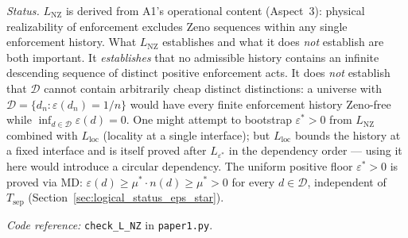 \documentclass[11pt]{article}
\theoremstyle{remark}
\newcommand{\coderef}[2]{\smallskip\noindent\textit{Code reference:} \texttt{#1} in \texttt{#2}.}
\begin{document}
\begin{tcolorbox}[apfbox, title={Lemma $L_{\mathrm{NZ}}$ (No Zeno Enforcement)}]
\smallskip\noindent\textit{Status.}  $L_{\mathrm{NZ}}$ is derived from A1's operational content (Aspect~3): physical realizability of enforcement excludes Zeno sequences within any single enforcement history.  What $L_{\mathrm{NZ}}$ establishes and what it does \emph{not} establish are both important.  It \emph{establishes} that no admissible history contains an infinite descending sequence of distinct positive enforcement acts.  It does \emph{not} establish that $\mathcal{D}$ cannot contain arbitrarily cheap distinct distinctions: a universe with $\mathcal{D} = \{d_n : \varepsilon(d_n) = 1/n\}$ would have every finite enforcement history Zeno-free while $\inf_{d \in \mathcal{D}} \varepsilon(d) = 0$.  One might attempt to bootstrap $\varepsilon^* > 0$ from $L_{\mathrm{NZ}}$ combined with $L_{\mathrm{loc}}$ (locality at a single interface); but $L_{\mathrm{loc}}$ bounds the history at a fixed interface and is itself proved after $L_{\varepsilon^*}$ in the dependency order --- using it here would introduce a circular dependency.  The uniform positive floor $\varepsilon^* > 0$ is proved via MD: $\varepsilon(d) \geq \mu^* \cdot n(d) \geq \mu^* > 0$ for every $d \in \mathcal{D}$, independent of $T_{\mathrm{sep}}$ (Section~\ref{sec:logical_status_eps_star}).

\coderef{check\_L\_NZ}{paper1.py}
\end{tcolorbox}
\end{document}
